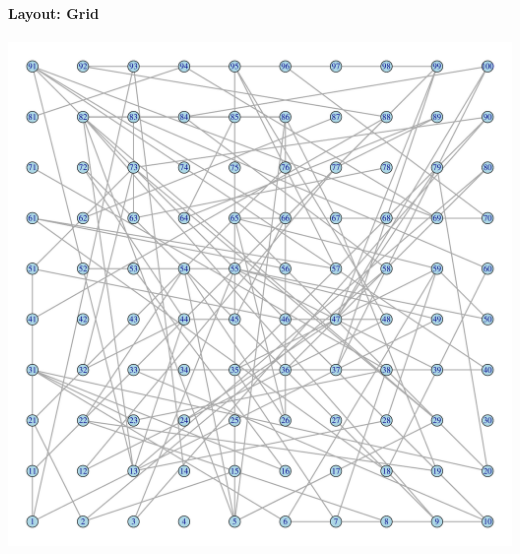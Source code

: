 \documentclass[8pt]{beamer}
\begin{document}

\begin{frame}
\frametitle{\insertsection}
\framesubtitle{Layout: Grid}

\centering
\includegraphics[height=0.85\textheight]{grid}
 
\end{frame}
\end{document}
